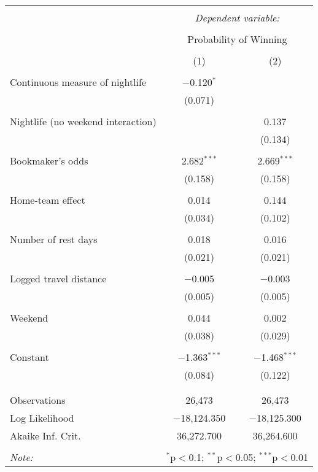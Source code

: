 \documentclass[letterpaper,12pt]{article}
\begin{document}
\begin{tabular}{@{\extracolsep{5pt}}lcc}  \\[-1.8ex]\hline  \hline \\[-1.8ex]   & \multicolumn{2}{c}{\textit{Dependent variable:}} \\  \cline{2-3}  \\[-1.8ex] & \multicolumn{2}{c}{Probability of Winning} \\  \\[-1.8ex] & (1) & (2)\\  \hline \\[-1.8ex]   Continuous measure of nightlife & $-$0.120$^{*}$ &  \\    & (0.071) &  \\    & & \\   Nightlife (no weekend interaction) &  & 0.137 \\    &  & (0.134) \\    & & \\   Bookmaker's odds & 2.682$^{***}$ & 2.669$^{***}$ \\    & (0.158) & (0.158) \\    & & \\   Home-team effect & 0.014 & 0.144 \\    & (0.034) & (0.102) \\    & & \\   Number of rest days & 0.018 & 0.016 \\    & (0.021) & (0.021) \\    & & \\   Logged travel distance & $-$0.005 & $-$0.003 \\    & (0.005) & (0.005) \\    & & \\   Weekend & 0.044 & 0.002 \\    & (0.038) & (0.029) \\    & & \\   Constant & $-$1.363$^{***}$ & $-$1.468$^{***}$ \\    & (0.084) & (0.122) \\    & & \\  \hline \\[-1.8ex]  Observations & 26,473 & 26,473 \\  Log Likelihood & $-$18,124.350 & $-$18,125.300 \\  Akaike Inf. Crit. & 36,272.700 & 36,264.600 \\  \hline  \hline \\[-1.8ex]  \textit{Note:}  & \multicolumn{2}{r}{$^{*}$p$<$0.1; $^{**}$p$<$0.05; $^{***}$p$<$0.01} \\  \end{tabular}  
\end{document}
